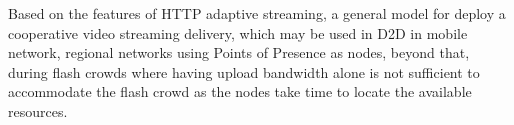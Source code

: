 Based on the features of HTTP adaptive streaming, a general model for deploy a cooperative video streaming delivery, which may be used in D2D in mobile network, regional networks using Points of Presence as nodes, beyond that, during flash crowds where having upload bandwidth alone is not sufficient to accommodate the flash crowd as the nodes take time to locate the available resources.



%
%
%	

